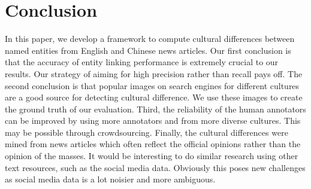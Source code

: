 \section{Conclusion}
In this paper, we develop a framework to compute cultural differences between
named entities from English and Chinese news articles.
Our first conclusion is that the accuracy of entity linking performance is
extremely crucial to our results.
Our strategy of aiming for high precision rather than recall pays off.
The second conclusion is that popular images on search engines for different
cultures are a good source for detecting cultural difference. We use these
images to create the ground truth of our evaluation.
Third, the reliability of the human annotators can be improved by using more
annotators and from more diverse cultures. This may be possible through
crowdsourcing.
Finally, the cultural differences were mined from news articles which often
reflect the official opinions rather than the opinion of the masses.
It would be interesting to do similar research using other text
resources, such as the social media data. Obviously this poses new
challenges as social media data is a lot noisier and more ambiguous.
